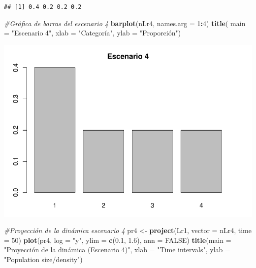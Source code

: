 \documentclass[
]{book}
\newenvironment{Shaded}{\begin{snugshade}}{\end{snugshade}}
\newcommand{\AttributeTok}[1]{\textcolor[rgb]{0.13,0.29,0.53}{#1}}
\newcommand{\CommentTok}[1]{\textcolor[rgb]{0.56,0.35,0.01}{\textit{#1}}}
\newcommand{\ConstantTok}[1]{\textcolor[rgb]{0.56,0.35,0.01}{#1}}
\newcommand{\DecValTok}[1]{\textcolor[rgb]{0.00,0.00,0.81}{#1}}
\newcommand{\FloatTok}[1]{\textcolor[rgb]{0.00,0.00,0.81}{#1}}
\newcommand{\FunctionTok}[1]{\textcolor[rgb]{0.13,0.29,0.53}{\textbf{#1}}}
\newcommand{\NormalTok}[1]{#1}
\newcommand{\OtherTok}[1]{\textcolor[rgb]{0.56,0.35,0.01}{#1}}
\newcommand{\SpecialCharTok}[1]{\textcolor[rgb]{0.81,0.36,0.00}{\textbf{#1}}}
\newcommand{\StringTok}[1]{\textcolor[rgb]{0.31,0.60,0.02}{#1}}
\theoremstyle{definition}
\theoremstyle{definition}
\theoremstyle{definition}
\theoremstyle{definition}
\theoremstyle{remark}
\begin{document}
\begin{verbatim}
## [1] 0.4 0.2 0.2 0.2
\end{verbatim}

\begin{Shaded}
\begin{Highlighting}[]
\CommentTok{\#Gráfica de barras del escenario 4 }
\FunctionTok{barplot}\NormalTok{(nLr4, }\AttributeTok{names.arg =} \DecValTok{1}\SpecialCharTok{:}\DecValTok{4}\NormalTok{)}
\FunctionTok{title}\NormalTok{( }\AttributeTok{main =} \StringTok{"Escenario 4"}\NormalTok{, }\AttributeTok{xlab =} \StringTok{"Categoría"}\NormalTok{, }\AttributeTok{ylab =} \StringTok{"Proporción"}\NormalTok{)}
\end{Highlighting}
\end{Shaded}

\includegraphics{Diagnostico_Poblacional_files/figure-latex/chap10_4-7.pdf}

\begin{Shaded}
\begin{Highlighting}[]
\CommentTok{\#Proyección de la dinámica escenario 4 }
\NormalTok{pr4 }\OtherTok{\textless{}{-}} \FunctionTok{project}\NormalTok{(Lr1, }\AttributeTok{vector =}\NormalTok{ nLr4, }\AttributeTok{time =} \DecValTok{50}\NormalTok{)}
\FunctionTok{plot}\NormalTok{(pr4, }\AttributeTok{log =} \StringTok{"y"}\NormalTok{, }\AttributeTok{ylim =} \FunctionTok{c}\NormalTok{(}\FloatTok{0.1}\NormalTok{, }\FloatTok{1.6}\NormalTok{), }\AttributeTok{ann =} \ConstantTok{FALSE}\NormalTok{)}
\FunctionTok{title}\NormalTok{(}\AttributeTok{main =} \StringTok{"Proyección de la dinámica (Escenario 4)"}\NormalTok{, }\AttributeTok{xlab =} \StringTok{"Time intervals"}\NormalTok{, }\AttributeTok{ylab =} \StringTok{"Population size/density"}\NormalTok{)}
\end{Highlighting}
\end{Shaded}
\end{document}
